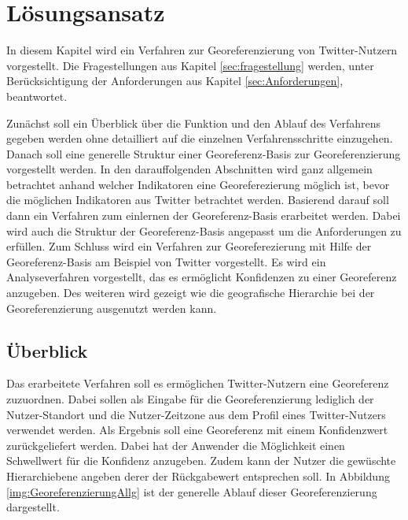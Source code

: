 \chapter{Lösungsansatz} \label{chp:Loesungsansatz}
	In diesem Kapitel wird ein Verfahren zur Georeferenzierung von Twitter-Nutzern vorgestellt.
	Die Fragestellungen aus Kapitel \ref{sec:fragestellung} werden, unter Berücksichtigung der Anforderungen aus Kapitel \ref{sec:Anforderungen}, beantwortet.  

	Zunächst soll ein Überblick über die Funktion und den Ablauf des Verfahrens gegeben werden ohne detailliert auf die einzelnen Verfahrensschritte einzugehen.
	Danach soll eine generelle Struktur einer Georeferenz-Basis zur Georeferenzierung vorgestellt werden.
	In den darauffolgenden Abschnitten wird ganz allgemein betrachtet anhand welcher Indikatoren eine Georeferezierung möglich ist, bevor die möglichen Indikatoren aus Twitter betrachtet werden.
	Basierend darauf soll dann ein Verfahren zum einlernen der Georeferenz-Basis erarbeitet werden.
	Dabei wird auch die Struktur der Georeferenz-Basis angepasst um die Anforderungen zu erfüllen.
	Zum Schluss wird ein Verfahren zur Georeferezierung mit Hilfe der Georeferenz-Basis am Beispiel von Twitter vorgestellt.
	Es wird ein Analyseverfahren vorgestellt, das es ermöglicht Konfidenzen zu einer Georeferenz anzugeben.
	Des weiteren wird gezeigt wie die geografische Hierarchie bei der Georeferenzierung ausgenutzt werden kann. 


	\section{Überblick} \label{sec:ueberblick} 
		Das erarbeitete Verfahren soll es ermöglichen Twitter-Nutzern eine Georeferenz zuzuordnen.
		Dabei sollen als Eingabe für die Georeferenzierung lediglich der Nutzer-Standort und die Nutzer-Zeitzone aus dem Profil eines Twitter-Nutzers verwendet werden.
		Als Ergebnis soll eine Georeferenz mit einem Konfidenzwert zurückgeliefert werden. 
		Dabei hat der Anwender die Möglichkeit einen Schwellwert für die Konfidenz anzugeben.
		Zudem kann der Nutzer die gewüschte Hierarchiebene angeben derer der Rückgabewert entsprechen soll. 
		In Abbildung \ref{img:GeoreferenzierungAllg} ist der generelle Ablauf dieser Georeferenzierung dargestellt. 

